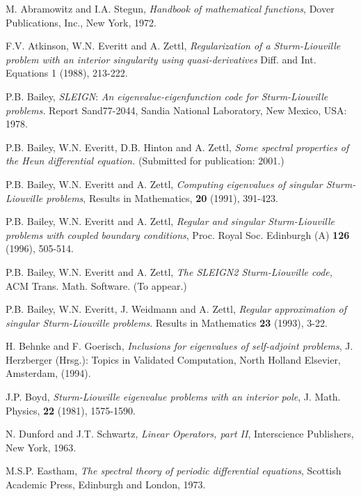 \documentclass[12pt]{amsart}%
\theoremstyle{plain}
\numberwithin{equation}{section}
\begin{document}
\begin{thebibliography}{9}                                                                                                %

M. Abramowitz and I.A. Stegun, \emph{Handbook of mathematical
functions}, Dover Publications, Inc., New York, 1972.

F.V. Atkinson, W.N. Everitt and A. Zettl, \emph{Regularization
of a Sturm-Liouville problem with an interior singularity using
quasi-derivatives} Diff. and Int. Equations 1 (1988), 213-222.

P.B. Bailey, \emph{SLEIGN}:\emph{ An eigenvalue-eigenfunction
code for Sturm-Liouville problems.} Report Sand77-2044, Sandia National
Laboratory, New Mexico, USA: 1978.

P.B. Bailey, W.N. Everitt, D.B. Hinton and A. Zettl, \emph{Some
spectral properties of the Heun differential equation.} (Submitted for
publication: 2001.)

P.B. Bailey, W.N. Everitt and A. Zettl, \emph{Computing
eigenvalues of singular Sturm-Liouville problems}, Results in Mathematics,
\textbf{20 }(1991), 391-423.

P.B. Bailey, W.N. Everitt and A. Zettl, \emph{Regular and
singular Sturm-Liouville problems with coupled boundary conditions}, Proc.
Royal Soc. Edinburgh (A) \textbf{126} (1996), 505-514.

P.B. Bailey, W.N. Everitt and A. Zettl, \emph{The SLEIGN2
Sturm-Liouville code,} ACM Trans. Math. Software. (To appear.)

P.B. Bailey, W.N. Everitt, J. Weidmann and A. Zettl,
\emph{Regular approximation of singular Sturm-Liouville problems}. Results in
Mathematics \textbf{23} (1993), 3-22.

H. Behnke and F. Goerisch, \emph{Inclusions for eigenvalues of
self-adjoint problems}, J. Herzberger (Hrsg.): Topics in Validated
Computation, North Holland Elsevier, Amsterdam, (1994).

J.P. Boyd, \emph{Sturm-Liouville eigenvalue problems with an
interior pole}, J. Math. Physics, \textbf{22 }(1981), 1575-1590.

N. Dunford and J.T. Schwartz, \emph{Linear Operators, part II},
Interscience Publishers, New York, 1963.

M.S.P. Eastham, \emph{The spectral theory of periodic differential
equations}, Scottish Academic Press, Edinburgh and London, 1973.


\end{thebibliography}
\end{document}
